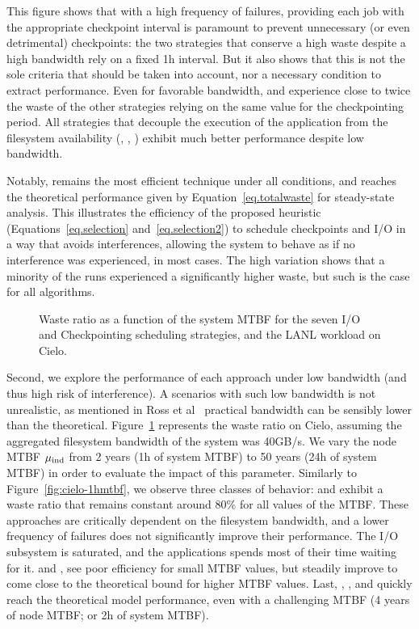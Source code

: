This figure shows that with a high frequency of failures, providing each job
with the appropriate checkpoint interval is paramount to prevent unnecessary (or
even detrimental) checkpoints: the two strategies that conserve a high waste
despite a high bandwidth rely on a fixed 1h interval. But it also shows that
this is not the sole criteria that should be taken into account, nor a necessary
condition to extract performance. Even for favorable bandwidth, \propdaly and
\bfifodaly experience close to twice the waste of the other strategies relying
on the same value for the checkpointing period. All strategies that decouple the
execution of the application from the filesystem availability (\fifodaly,
\fifofixed, \cooperative) exhibit much better performance despite low bandwidth.

Notably, \cooperative remains the most efficient technique under all
conditions, and reaches the theoretical performance given by
Equation~\eqref{eq.totalwaste} for steady-state analysis. This
illustrates the efficiency of the proposed heuristic
(Equations~\eqref{eq.selection} and~\eqref{eq.selection2}) to schedule
checkpoints and I/O in a way that avoids interferences, allowing the
system to behave as if no interference was experienced, in most
cases. The high variation shows that a minority of the runs
experienced a significantly higher waste, but such is the case for
all algorithms.

\begin{figure}
  \begin{center}
    \resizebox{\linewidth}{!}{}
  \end{center}
  \caption{Waste ratio as a function of the system MTBF for the
    seven I/O and Checkpointing scheduling strategies, and the LANL workload on
    Cielo. \label{fig:cielo-40gbs}}
\end{figure}

Second, we explore the performance of each approach under low bandwidth (and
thus high risk of interference). A scenarios with such low bandwidth is not
unrealistic, as mentioned in Ross et al~\cite{XX} practical bandwidth can be
sensibly lower than the theoretical.
Figure~\ref{fig:cielo-40gbs} represents the waste ratio on Cielo,
assuming the aggregated filesystem bandwidth of the system was
40GB/s. We vary the node MTBF $\mu_{\text{ind}}$ from 2 years (1h of system
MTBF) to 50 years (24h of system MTBF) in order to evaluate the impact
of this parameter. Similarly to Figure~\ref{fig:cielo-1hmtbf}, we
observe three classes of behavior: \propfixed and \bfifofixed exhibit
a waste ratio that remains constant around 80\% for all values of the
MTBF. These approaches are critically dependent on the filesystem
bandwidth, and a lower frequency of failures does not significantly
improve their performance. The I/O subsystem is saturated, and the
applications spends most of their time waiting for it.
%
\propdaly and \bfifodaly, see poor efficiency for small MTBF values,
but steadily improve to come close to the theoretical bound for higher
MTBF values. Last, \fifodaly,
\fifofixed, and \cooperative quickly reach the theoretical model
performance, even with a challenging MTBF (4 years of node MTBF; or 2h of
system MTBF).

